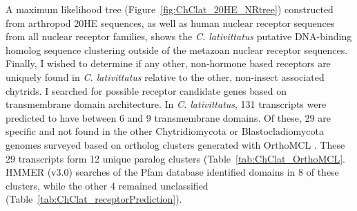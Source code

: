 \indent A maximum likelihood tree (Figure~\ref{fig:ChClat_20HE_NRtree}) constructed from arthropod 20HE sequences, as well as human nuclear receptor sequences from all nuclear receptor families, shows the \textit{C. lativittatus} putative DNA-binding homolog sequence clustering outside of the metazoan nuclear receptor sequences. \\
\indent Finally, I wished to determine if any other, non-hormone based receptors are uniquely found in \textit{C. lativittatus} relative to the other, non-insect associated chytrids. I searched for possible receptor candidate genes based on transmembrane domain architecture. In \textit{C. lativittatus}, 131 transcripts were predicted to have between 6 and 9 transmembrane domains. Of these, 29 are specific and not found in the other Chytridiomycota or Blastocladiomycota genomes surveyed based on ortholog clusters generated with OrthoMCL \cite{Li2003}. These 29 transcripts form 12 unique paralog clusters (Table~\ref{tab:ChClat_OrthoMCL}. HMMER (v3.0) searches of the Pfam database identified domains in 8 of these clusters, while the other 4 remained unclassified (Table~\ref{tab:ChClat_receptorPrediction}).\\
